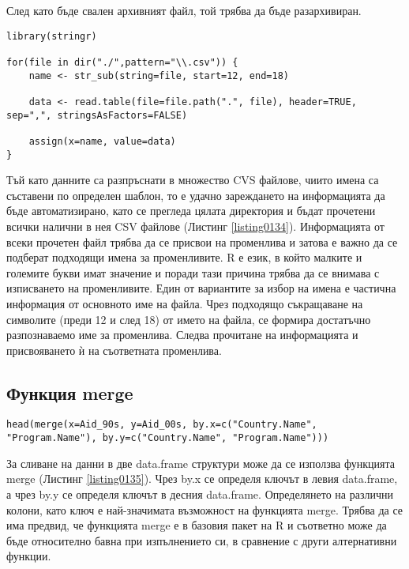 След като бъде свален архивният файл, той трябва да бъде разархивиран.

\begin{lstlisting}[caption=Зареждане USAID данните в R, label=listing0134]
library(stringr)

for(file in dir("./",pattern="\\.csv")) {
	name <- str_sub(string=file, start=12, end=18)

	data <- read.table(file=file.path(".", file), header=TRUE, sep=",", stringsAsFactors=FALSE)

	assign(x=name, value=data)
}
\end{lstlisting}

Тъй като данните са разпръснати в множество CVS файлове, чиито имена са съставени по определен шаблон, то е удачно зареждането на информацията да бъде автоматизирано, като се прегледа цялата директория и бъдат прочетени всички налични в нея CSV файлове (Листинг \ref{listing0134}). Информацията от всеки прочетен файл трябва да се присвои на променлива и затова е важно да се подберат подходящи имена за променливите. R е език, в който малките и големите букви имат значение и поради тази причина трябва да се внимава с изписването на променливите. Един от вариантите за избор на имена е частична информация от основното име на файла. Чрез подходящо съкращаване на символите (преди 12 и след 18) от името на файла, се формира достатъчно разпознаваемо име за променлива. Следва прочитане на информацията и присвояването ѝ на съответната променлива.

\subsection{Функция merge}

\begin{lstlisting}[caption=Сливане на данни с merge, label=listing0135]
head(merge(x=Aid_90s, y=Aid_00s, by.x=c("Country.Name", "Program.Name"), by.y=c("Country.Name", "Program.Name")))
\end{lstlisting}

За сливане на данни в две data.frame структури може да се използва функцията merge (Листинг \ref{listing0135}). Чрез by.x се определя ключът в левия data.frame, а чрез by.y се определя ключът в десния data.frame. Определянето на различни колони, като ключ е най-значимата възможност на функцията merge. Трябва да се има предвид, че функцията merge е в базовия пакет на R и съответно може да бъде относително бавна при изпълнението си, в сравнение с други алтернативни функции.

